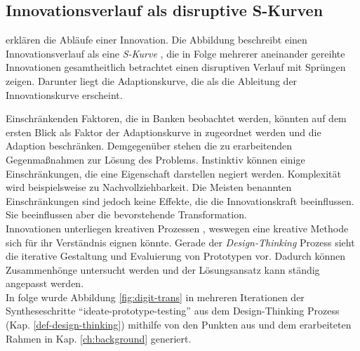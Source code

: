 \subsection{Innovationsverlauf als disruptive S-Kurven}
\citet[Kap. 2.2]{Alt2017} erklären die Abläufe einer Innovation. Die Abbildung \cite[Abb. 2.1]{Alt2017} beschreibt einen Innovationsverlauf als eine \emph{S-Kurve} \cite{Ganswindt2006}, die in Folge mehrerer aneinander gereihte Innovationen gesamtheitlich betrachtet einen disruptiven Verlauf mit Sprüngen zeigen. Darunter liegt die Adaptionskurve, die als die Ableitung der Innovationskurve erscheint. 

Einschränkenden Faktoren, die in Banken beobachtet werden, könnten auf dem ersten Blick als Faktor der Adaptionskurve in \cite[Abb. 2.1]{Alt2017} zugeordnet werden und die Adaption beschränken. Demgegenüber stehen die zu erarbeitenden Gegenmaßnahmen zur Lösung des Problems. Instinktiv können einige Einschränkungen, die eine Eigenschaft darstellen negiert werden. Komplexität wird beispielsweise zu Nachvollziehbarkeit. Die Meisten benannten Einschränkungen sind jedoch keine Effekte, die die Innovationskraft \cite{Ganswindt2006} beeinflussen. Sie beeinflussen aber die bevorstehende Transformation. 
\medskip
\\
Innovationen unterliegen kreativen Prozessen \cite[S.14]{Alt2017}, weswegen eine kreative Methode sich für ihr Verständnis eignen könnte. Gerade der \emph{Design-Thinking} Prozess sieht die iterative Gestaltung und Evaluierung von Prototypen vor. Dadurch können Zusammenhönge untersucht werden und der Lösungsansatz kann ständig angepasst werden.
\medskip
\\
In folge wurde Abbildung \ref{fig:digit-trans} in mehreren Iterationen der Syntheseschritte \enquote{ideate-prototype-testing} aus dem Design-Thinking Prozess (Kap. \ref{def-design-thinking}) mithilfe von den Punkten aus \cite[S. 14]{Alt2017} und dem erarbeiteten Rahmen in Kap. \ref{ch:background} generiert.
%


